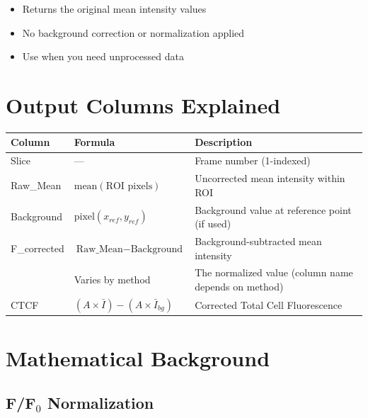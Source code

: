 \documentclass[11pt,a4paper]{article}
\begin{document}
\begin{itemize}
    \item Returns the original mean intensity values
    \item No background correction or normalization applied
    \item Use when you need unprocessed data
\end{itemize}

\section{Output Columns Explained}

\begin{table}[h]
\centering
\begin{tabular}{@{}p{2.5cm}p{4.5cm}p{6cm}@{}}
\toprule
\textbf{Column} & \textbf{Formula} & \textbf{Description} \\
\midrule
Slice & --- & Frame number (1-indexed) \\
Raw\_Mean & $\text{mean}(\text{ROI pixels})$ & Uncorrected mean intensity within ROI \\
Background & $\text{pixel}(x_{ref}, y_{ref})$ & Background value at reference point (if used) \\
F\_corrected & $\text{Raw\_Mean} - \text{Background}$ & Background-subtracted mean intensity \\
[Normalized] & Varies by method & The normalized value (column name depends on method) \\
CTCF & $(A \times \bar{I}) - (A \times \bar{I}_{bg})$ & Corrected Total Cell Fluorescence \\
\bottomrule
\end{tabular}
\end{table}

\section{Mathematical Background}

\subsection{F/F$_0$ Normalization}
\end{document}
